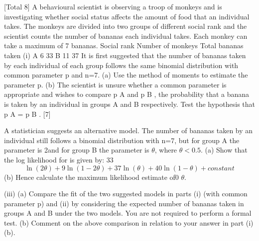 \documentclass[a4paper,12pt]{article}
\begin{document}
[Total 8]
A behavioural scientist is observing a troop of monkeys and is investigating whether
social status affects the amount of food that an individual takes. The monkeys are
divided into two groups of different social rank and the scientist counts the number of
bananas each individual takes. Each monkey can take a maximum of 7 bananas.
Social rank
Number of monkeys
Total bananas taken
(i)
A
6
33
B
11
37
It is first suggested that the number of bananas taken by each individual of each group follows the same binomial distribution with common parameter p
and n=7.
(a) Use the method of moments to estimate the parameter p.
(b) The scientist is unsure whether a common parameter is appropriate and wishes to compare p A and p B , the probability that a banana is taken
by an individual in groups A and B respectively.
Test the hypothesis that p A = p B .
[7]
\item 
A statistician suggests an alternative model. The number of bananas taken by
an individual still follows a binomial distribution with n=7, but for group A
the parameter is 2\theta and for group B the parameter is $\theta$, where $\theta < 0.5$.
(a)
Show that the log likelihood for \theta is given by:
33
\[\ln ( 2 \theta ) + 9 \ln ( 1 − 2 \theta ) + 37 \ln ( \theta ) + 40 \ln ( 1 − \theta ) + constant\]
(b)
Hence calculate the maximum likelihood estimate of0 $\theta$.

(iii)
(a) Compare the fit of the two suggested models in parts (i) (with common
parameter p) and (ii) by considering the expected number of bananas
taken in groups A and B under the two models. You are not required
to perform a formal test.
(b) Comment on the above comparison in relation to your answer in
part (i)(b).

\end{document}

